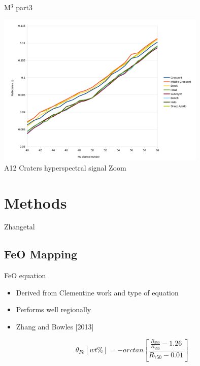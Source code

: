 \documentclass[unknownkeysallowed,xcolor=dvipsnames,beamer]{beamer} %
\begin{document}
\begin{frame}[fragile]{M$^3$ part3}
\begin{center}
  \includegraphics[width=10cm]{images/fig5}\\
  A12 Craters hyperspectral signal Zoom
  \end{center}
\end{frame}

\section{Methods}
\begin{frame}[fragile]{Zhangetal}
\subsection{FeO Mapping}
\begin{block}{FeO equation}
\begin{itemize}
\item Derived from Clementine work and type of equation
\item Performs well regionally
\item Zhang and Bowles [2013]
\end{itemize}
\end{block}
\begin{block}{}
\begin{equation}\label{zhang2013corrected}
 \theta_{Fe} [wt\%] = -arctan \left[ \frac {\frac {R_{950}} {R_{750}} - 1.26} {R_{750} - 0.01} \right]
\end{equation}
\end{block}
\end{frame}
\end{document}
